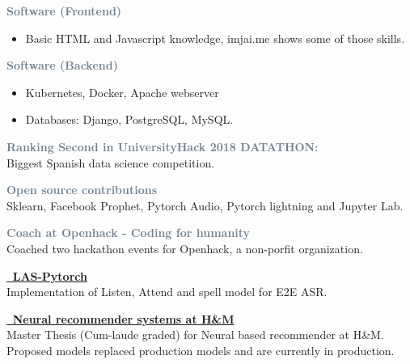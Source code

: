 \textcolor{SlateGrey}{\textbf{Software (Frontend)}}
\newline

\begin{itemize}
    \item Basic HTML and Javascript knowledge, imjai.me shows some of those skills.
\end{itemize}

\textcolor{SlateGrey}{\textbf{Software (Backend)}}
\newline

\begin{itemize}
    \item Kubernetes, Docker, Apache webserver
    \item Databases: Django, PostgreSQL, MySQL. 
\end{itemize}



\textcolor{SlateGrey}{\textbf{Ranking Second in UniversityHack 2018 DATATHON}}: \\ Biggest Spanish data science competition.
\newline


\vspace{1pt}

\textcolor{SlateGrey}{\textbf{Open source contributions}} \\ Sklearn, Facebook Prophet, Pytorch Audio, Pytorch lightning and Jupyter Lab.
\newline


\vspace{1pt}

\textcolor{SlateGrey}{\textbf{Coach at Openhack - Coding for humanity}} \\ Coached two hackathon events for Openhack, a non-porfit organization.




\clearpage
\newpage


\textcolor{SlateGrey}{\textbf{\href{https://github.com/jiwidi/las-pytorch}{\faGithub \, LAS-Pytorch }}} \\ 
Implementation of Listen, Attend and spell model for E2E ASR.
\newline
\vspace{1pt}

\textcolor{SlateGrey}{\textbf{\href{https://github.com/jiwidi/MASTER_THESIS/blob/master/thesis.pdf}{\faGithub \,  Neural recommender systems at H\&M  }}} \\ 
Master Thesis (Cum-laude graded) for Neural based recommender at H\&M. Proposed models replaced production models and are currently in production.
\newline
\vspace{1pt}

